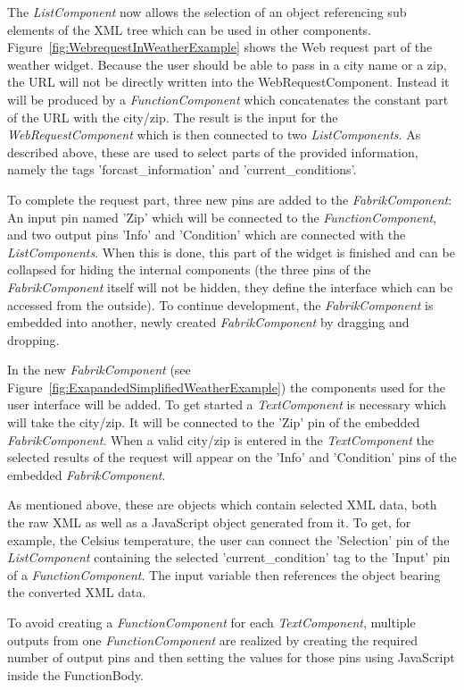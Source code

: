 \documentclass[pdftex, times, 10pt, twocolumn]{article}
\begin{document}
The {\em ListComponent} now allows the selection of an object referencing sub elements of the XML tree which can be used in other components. Figure~\ref{fig:WebrequestInWeatherExample} shows the Web request part of the weather widget. Because the user should be able to pass in a city name or a zip, the URL will not be directly written into the WebRequestComponent. Instead it will be produced by a {\em FunctionComponent} which concatenates the constant part of the URL with the city/zip. The result is the input for the {\em WebRequestComponent} which is then connected to two {\em ListComponents}. As described above, these are used to select parts of the provided information, namely the tags 'forcast\_information' and 'current\_conditions'. 

To complete the request part, three new pins are added to the {\em FabrikComponent}: An input pin named 'Zip' which will be connected to the {\em FunctionComponent}, and two output pins 'Info' and 'Condition' which are connected with the {\em ListComponents}. When this is done, this part of the widget is finished and can be collapsed for hiding the internal components (the three pins of the {\em FabrikComponent} itself will not be hidden, they define the interface which can be accessed from the outside). To continue development, the {\em FabrikComponent} is embedded into another, newly created {\em FabrikComponent} by dragging and dropping. 

In the new {\em FabrikComponent} (see Figure~\ref{fig:ExapandedSimplifiedWeatherExample}) the components used for the user interface will be added. To get started a {\em TextComponent} is necessary which will take the city/zip. It will be connected to the 'Zip' pin of the embedded {\em FabrikComponent}. When a valid city/zip is entered in the {\em TextComponent} the selected results of the request will appear on the 'Info' and 'Condition' pins of the embedded {\em FabrikComponent}. 

As mentioned above, these are objects which contain selected XML data, both the raw XML as well as a JavaScript object generated from it. To get, for example, the Celsius temperature, the user can connect the 'Selection' pin of the {\em ListComponent} containing the selected 'current\_condition' tag to the 'Input' pin of a {\em FunctionComponent}. The input variable then references the object bearing the converted XML data.  

To avoid creating a {\em FunctionComponent} for each {\em TextComponent}, multiple outputs from one {\em FunctionComponent} are realized by creating the required number of output pins and then setting the values for those  pins using JavaScript inside the FunctionBody. 
\end{document}
